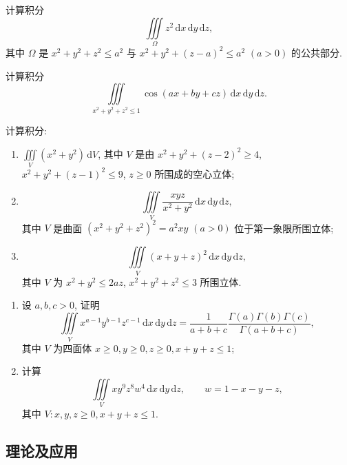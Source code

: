 \documentclass[../../数学分析培优讲义.tex]{subfiles}
\begin{document}
\begin{example}
计算积分
\[
    \iiint\limits_\Omega z^2\,\mathrm{d}x\,\mathrm{d}y\,\mathrm{d}z,
\]
其中 $\Omega$ 是 $x^2+y^2+z^2\leq a^2$ 与 $x^2+y^2+(z-a)^2\leq a^2$ $(a>0)$ 的公共部分.
\end{example}
\exampleblank

\begin{example}
计算积分
\[
    \iiint\limits_{x^2+y^2+z^2\leq1}\cos(ax+by+cz)\,\mathrm{d}x\,\mathrm{d}y\,\mathrm{d}z.
\]
\end{example}
\exampleblank

\begin{example}
计算积分:
\begin{enumerate}[label=(\arabic*)]
    \item $\displaystyle\iiint\limits_V(x^2+y^2)\,\mathrm{d}V$, 其中 $V$ 是由 $x^2+y^2+(z-2)^2\geq4$, $x^2+y^2+(z-1)^2\leq9$, $z\geq0$ 所围成的空心立体;
    \item
    \[
        \iiint\limits_V\dfrac{xyz}{x^2+y^2}\,\mathrm{d}x\,\mathrm{d}y\,\mathrm{d}z,
    \]
    其中 $V$ 是曲面 $(x^2+y^2+z^2)^2=a^2xy$ $(a>0)$ 位于第一象限所围立体;
    \item
    \[
        \iiint\limits_V(x+y+z)^2\,\mathrm{d}x\,\mathrm{d}y\,\mathrm{d}z,
    \]
    其中 $V$ 为 $x^2+y^2\leq2az$, $x^2+y^2+z^2\leq3$ 所围立体.
\end{enumerate}
\end{example}
\exampleblank

\begin{example}[\markstar]
\begin{enumerate}[label=(\arabic*)]
    \item 设 $a,b,c>0$, 证明
    \[
        \iiint\limits_Vx^{a-1}y^{b-1}z^{c-1}\,\mathrm{d}x\,\mathrm{d}y\,\mathrm{d}z
        =\dfrac{1}{a+b+c}\dfrac{\Gamma(a)\Gamma(b)\Gamma(c)}{\Gamma(a+b+c)},
    \]
    其中 $V$ 为四面体 $x\geq0,y\geq0,z\geq0,x+y+z\leq1$;
    \item 计算
    \[
        \iiint\limits_Vxy^9z^8w^4\,\mathrm{d}x\,\mathrm{d}y\,\mathrm{d}z,
        \qquad w=1-x-y-z,
    \]
    其中 $V:x,y,z\geq0,x+y+z\leq1$.
\end{enumerate}
\end{example}
\exampleblank



\subsection{理论及应用}
\end{document}
